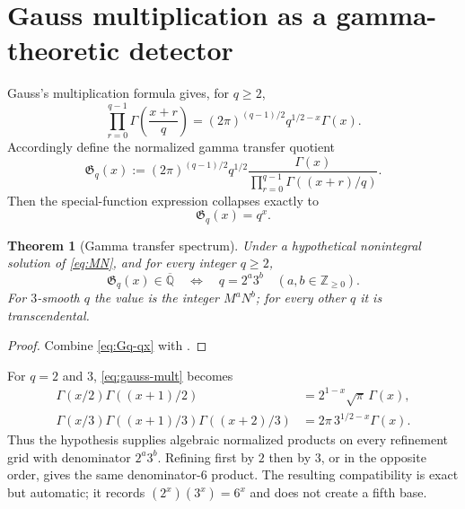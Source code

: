 \documentclass[11pt]{article}
\numberwithin{equation}{section}
\newtheorem{theorem}{Theorem}[section]
\theoremstyle{definition}
\theoremstyle{remark}
\newcommand{\Z}{\mathbb{Z}}
\newcommand{\Qbar}{\overline{\mathbb{Q}}}
\begin{document}
\section{Gauss multiplication as a gamma-theoretic detector}
\label{sec:gauss}

Gauss's multiplication formula gives, for $q\ge2$,
\begin{equation}
 \prod_{r=0}^{q-1}\Gamma\!\left(\frac{x+r}{q}\right)
 =(2\pi)^{(q-1)/2}q^{1/2-x}\Gamma(x).
 \label{eq:gauss-mult}
\end{equation}
Accordingly define the normalized gamma transfer quotient
\begin{equation}
 \mathfrak G_q(x):=
 (2\pi)^{(q-1)/2}q^{1/2}
 \frac{\Gamma(x)}{\displaystyle\prod_{r=0}^{q-1}\Gamma((x+r)/q)}.
 \label{eq:Gq}
\end{equation}
Then the special-function expression collapses exactly to
\begin{equation}
 \mathfrak G_q(x)=q^x.
 \label{eq:Gq-qx}
\end{equation}

\begin{theorem}[Gamma transfer spectrum]
\label{thm:gamma-spectrum}
Under a hypothetical nonintegral solution of \eqref{eq:MN}, and for every integer $q\ge2$,
\begin{equation}
 \mathfrak G_q(x)\in\Qbar
 \quad\Longleftrightarrow\quad
 q=2^a3^b\quad(a,b\in\Z_{\ge0}).
 \label{eq:gamma-spectrum}
\end{equation}
For $3$-smooth $q$ the value is the integer $M^aN^b$; for every other $q$ it is transcendental.
\end{theorem}

\begin{proof}
Combine \eqref{eq:Gq-qx} with .
\end{proof}

For $q=2$ and $3$, \eqref{eq:gauss-mult} becomes
\begin{align}
 \Gamma(x/2)\Gamma((x+1)/2)
 &=2^{1-x}\sqrt\pi\,\Gamma(x),\label{eq:dup-at-x}\\
 \Gamma(x/3)\Gamma((x+1)/3)\Gamma((x+2)/3)
 &=2\pi\,3^{1/2-x}\Gamma(x).
 \label{eq:trip-at-x}
\end{align}
Thus the hypothesis supplies algebraic normalized products on every refinement grid with denominator $2^a3^b$.  Refining first by $2$ then by $3$, or in the opposite order, gives the same denominator-$6$ product.  The resulting compatibility is exact but automatic; it records $(2^x)(3^x)=6^x$ and does not create a fifth base.
\end{document}
